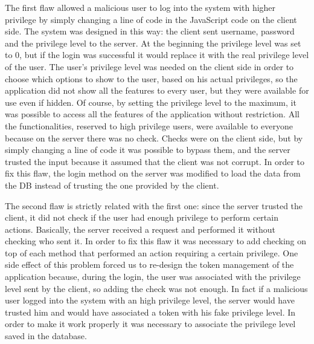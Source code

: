 The first flaw allowed a malicious user to log into the system with higher privilege by simply changing a line of code in the JavaScript code on the client side.\newline
The system was designed in this way: the client sent username, password and the privilege level to the server. At the beginning the privilege level was set to 0, but if the login was successful it would replace it with the real privilege level of the user.\newline
The user's privilege level was needed on the client side in order to choose which options to show to the user, based on his actual privileges, so the application did not show all the features to every user, but they were available for use even if hidden.\newline
Of course, by setting the privilege level to the maximum, it was possible to access all the features of the application without restriction.\newline
All the functionalities, reserved to high privilege users, were available to everyone because on the server there was no check.\newline
Checks were on the client side, but by simply changing a line of code it was possible to bypass them, and the server trusted the input because it assumed that the client was not corrupt.\newline
In order to fix this flaw, the login method on the server was modified to load the data from the DB instead of trusting the one provided by the client.\newline

The second flaw is strictly related with the first one: since the server trusted the client, it did not check if the user had enough privilege to perform certain actions.\newline
Basically, the server received a request and performed it without checking who sent it.\newline
In order to fix this flaw it was necessary to add checking on top of each method that performed an action requiring a certain privilege.\newline
One side effect of this problem forced us to re-design the token management of the application because, during the login, the user was associated with the privilege level sent by the client, so adding the check was not enough. In fact if a malicious user logged into the system with an high privilege level, the server would have trusted him and would have associated a token with his fake privilege level.\newline
In order to make it work properly it was necessary to associate the privilege level saved in the database.\newline

